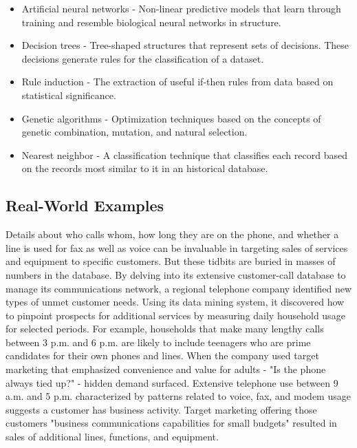 \documentclass[12pt]{article}
\begin{document}
\begin{itemize}
\item Artificial neural networks - Non-linear predictive models that learn through training and resemble biological neural networks in structure.

\item Decision trees - Tree-shaped structures that represent sets of decisions. These decisions generate rules for the classification of a dataset.

\item Rule induction - The extraction of useful if-then rules from data based on statistical significance.

\item Genetic algorithms - Optimization techniques based on the concepts of genetic combination, mutation, and natural selection.

\item Nearest neighbor - A classification technique that classifies each record based on the records most similar to it in an historical database.
\end{itemize}

\subsection{Real-World Examples}
Details about who calls whom, how long they are on the phone, and whether a line is used for fax as well as voice can be invaluable in targeting sales of services and equipment to specific customers. But these tidbits are buried in masses of numbers in the database. By delving into its extensive customer-call database to manage its communications network, a regional telephone company identified new types of unmet customer needs. Using its data mining system, it discovered how to pinpoint prospects for additional services by measuring daily household usage for selected periods. For example, households that make many lengthy calls between 3 p.m. and 6 p.m. are likely to include teenagers who are prime candidates for their own phones and lines. When the company used target marketing that emphasized convenience and value for adults - "Is the phone always tied up?" - hidden demand surfaced. Extensive telephone use between 9 a.m. and 5 p.m. characterized by patterns related to voice, fax, and modem usage suggests a customer has business activity. Target marketing offering those customers "business communications capabilities for small budgets" resulted in sales of additional lines, functions, and equipment.
\end{document}

